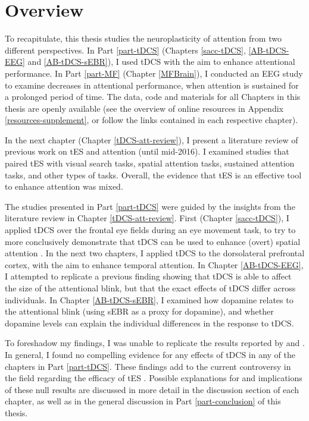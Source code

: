 \documentclass[11pt,english,]{memoir}
\begin{document}
\hypertarget{overview}{%
\section{Overview}\label{overview}}

To recapitulate, this thesis studies the neuroplasticity of attention from two different perspectives. In Part \ref{part-tDCS} (Chapters \ref{sacc-tDCS}, \ref{AB-tDCS-EEG} and \ref{AB-tDCS-sEBR}), I used tDCS with the aim to enhance attentional performance. In Part \ref{part-MF} (Chapter \ref{MFBrain}), I conducted an EEG study to examine decreases in attentional performance, when attention is sustained for a prolonged period of time. The data, code and materials for all Chapters in this thesis are openly available (see the overview of online resources in Appendix \ref{resources-supplement}, or follow the links contained in each respective chapter).

In the next chapter (Chapter \ref{tDCS-att-review}), I present a literature review of previous work on tES and attention (until mid-2016). I examined studies that paired tES with visual search tasks, spatial attention tasks, sustained attention tasks, and other types of tasks. Overall, the evidence that tES is an effective tool to enhance attention was mixed.

The studies presented in Part \ref{part-tDCS} were guided by the insights from the literature review in Chapter \ref{tDCS-att-review}. First (Chapter \ref{sacc-tDCS}), I applied tDCS over the frontal eye fields during an eye movement task, to try to more conclusively demonstrate that tDCS can be used to enhance (overt) spatial attention \autocite[in line with a previous study by][]{Kanai2012}. In the next two chapters, I applied tDCS to the dorsolateral prefrontal cortex, with the aim to enhance temporal attention. In Chapter \ref{AB-tDCS-EEG}, I attempted to replicate a previous finding \autocite{London2015} showing that tDCS is able to affect the size of the attentional blink, but that the exact effects of tDCS differ across individuals. In Chapter \ref{AB-tDCS-sEBR}, I examined how dopamine relates to the attentional blink (using sEBR as a proxy for dopamine), and whether dopamine levels can explain the individual differences in the response to tDCS.

To foreshadow my findings, I was unable to replicate the results reported by \textcite{Kanai2012} and \textcite{London2015}. In general, I found no compelling evidence for any effects of tDCS in any of the chapters in Part \ref{part-tDCS}. These findings add to the current controversy in the field regarding the efficacy of tES \autocites{Bestmann2017}{Heroux2017}{Horvath2015b}. Possible explanations for and implications of these null results are discussed in more detail in the discussion section of each chapter, as well as in the general discussion in Part \ref{part-conclusion} of this thesis.
\end{document}
